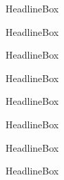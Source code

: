 	\allmycounters
	\begin{mybox}{\currentboxsection \ Headline}{Box \theboxcount} \\
		\allmycounters
	\end{mybox}
	\begin{mybox}{\currentboxsection \ Headline}{Box \theboxcount} \\
		\allmycounters
	\end{mybox}
	
		\allmycounters
		\begin{mybox}{\currentboxsection \ Headline}{Box \theboxcount} \\
			\allmycounters
		\end{mybox}
		\begin{mybox}{\currentboxsection \ Headline}{Box \theboxcount} \\
			\allmycounters
		\end{mybox}
		
			\allmycounters
			\begin{mybox}{\currentboxsection \ Headline}{Box \theboxcount} \\
				\allmycounters
			\end{mybox}
			\begin{mybox}{\currentboxsection \ Headline}{Box \theboxcount} \\
				\allmycounters
			\end{mybox}
			
				\allmycounters
				\begin{mybox}{\currentboxsection \ Headline}{Box \theboxcount} \\
					\allmycounters
				\end{mybox}
				\begin{mybox}{\currentboxsection \ Headline}{Box \theboxcount} \\
					\allmycounters
				\end{mybox}
				
